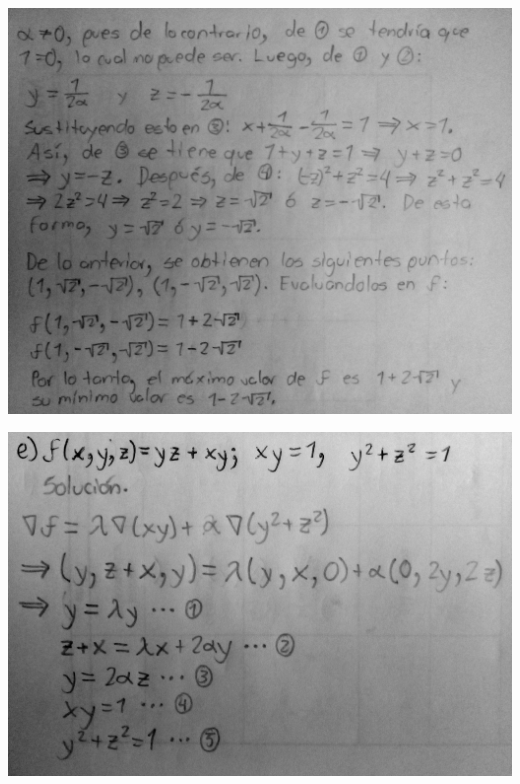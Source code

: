 \documentclass[fleqn, 12pt]{article}
\begin{document}
\begin{list}{\bfseries Ejercicio}{ \addtolength{\itemindent}{-1mm}%
    \addtolength{\labelsep}{-1mm}%
    \addtolength{\leftmargin}{-1cm}%
    \addtolength{\labelwidth}{-1cm} }
\begin{enumerate}[a)]
        \includegraphics[width = 1.0\linewidth]{Ejercicio d2.jpg}
       
        \includegraphics[width = 1.0\linewidth]{Ejercicio e1.jpg}
       

\end{enumerate}
\end{list}
\end{document}
